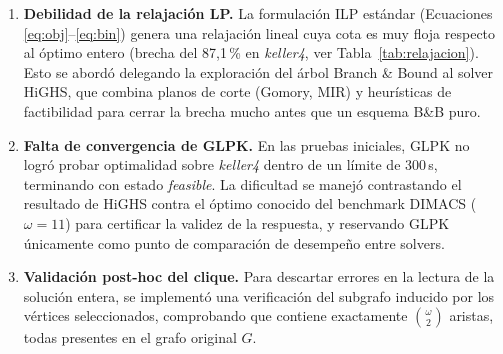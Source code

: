 \begin{enumerate}
    \item \textbf{Debilidad de la relajación LP.} La formulación ILP estándar (Ecuaciones \eqref{eq:obj}--\eqref{eq:bin}) genera una relajación lineal cuya cota es muy floja respecto al óptimo entero (brecha del 87{,}1\,\% en \textit{keller4}, ver Tabla~\ref{tab:relajacion}). Esto se abordó delegando la exploración del árbol Branch \& Bound al solver HiGHS, que combina planos de corte (Gomory, MIR) y heurísticas de factibilidad para cerrar la brecha mucho antes que un esquema B\&B puro.

    \item \textbf{Falta de convergencia de GLPK.} En las pruebas iniciales, GLPK no logró probar optimalidad sobre \textit{keller4} dentro de un límite de 300\,s, terminando con estado \textit{feasible}. La dificultad se manejó contrastando el resultado de HiGHS contra el óptimo conocido del benchmark DIMACS ($\omega = 11$) para certificar la validez de la respuesta, y reservando GLPK únicamente como punto de comparación de desempeño entre solvers.

    \item \textbf{Validación post-hoc del clique.} Para descartar errores en la lectura de la solución entera, se implementó una verificación del subgrafo inducido por los vértices seleccionados, comprobando que contiene exactamente $\binom{\omega}{2}$ aristas, todas presentes en el grafo original $G$.
\end{enumerate}


